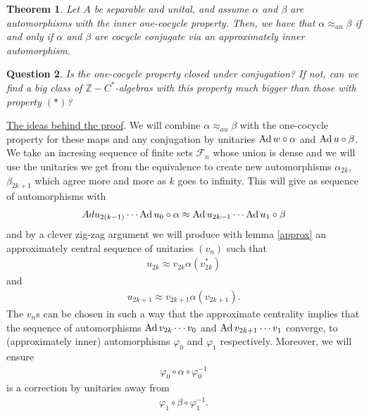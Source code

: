 \documentclass[11pt,a4paper,oneside]{amsart}
\newtheorem{theorem}{Theorem}[section]
\newtheorem{question}[theorem]{Question}
\newcommand{\Ad}{{\rm Ad\,}}
\begin{document}
\begin{theorem}
Let $A$ be separable and unital, and assume $\alpha$ and $\beta$ are automorphisms with the inner one-cocycle property. Then, we have that $\alpha\approx_{au}\beta$ if and only if $\alpha$ and $\beta$ are cocycle conjugate via an approximately inner automorphism. \label{Evans-Kishimoto} 
\end{theorem}

\begin{question}
Is the one-cocycle property closed under conjugation? If not, can we find a big class of $\mathbb{Z}-C^*$-algebras with this property much bigger than those with property $(*)$?
\end{question}



\begin{tcolorbox}[colback= Cyan! 20] 
\underline{The ideas behind the proof}. We will combine $\alpha \approx_{au}\beta$ with the one-cocycle property for these maps and any conjugation by unitaries $\Ad w\circ \alpha$ and $\Ad u\circ \beta$.  We take an incresing sequence of finite sets $\mathcal F_n$ whose union is dense and we will use the unitaries  we get from the equivalence to create new automorphisms $\alpha_{2k}$, $\beta_{2k+1}$ which agree more and more as $k$ goes to infinity. This will give as sequence of automorphisms with \begin{align}Ad u_{2(k-1)}\cdots \Ad u_0\circ \alpha \approx \Ad u_{2k-1}\cdots \Ad u_1\circ \beta\end{align} and by a clever zig-zag argument we will produce with lemma \ref{approx} an approximately central sequence of unitaries $(v_n)$ such that \begin{align}
u_{2k} \approx v_{2k}\alpha(v_{2k}^*)
\end{align} and \begin{align}
u_{2k+1}\approx v_{2k+1}\alpha(v_{2k+1}).
\end{align} The $v_n$s can be chosen in such a way that the approximate centrality implies that the sequence of automorphisms $\Ad v_{2k}\cdots v_0$ and $\Ad v_{2k+1}\cdots v_1$ converge, to (approximately inner) automorphisms $\varphi_0$ and $\varphi_1$ respectively.  Moreover, we will ensure 
\begin{align}
\varphi_0\circ\alpha\circ\varphi_0^{-1} \end{align} is a correction by unitaries away from \begin{align}
\varphi_1\circ\beta\circ\varphi_1^{-1}.
\end{align} 


\end{tcolorbox}
\end{document}
